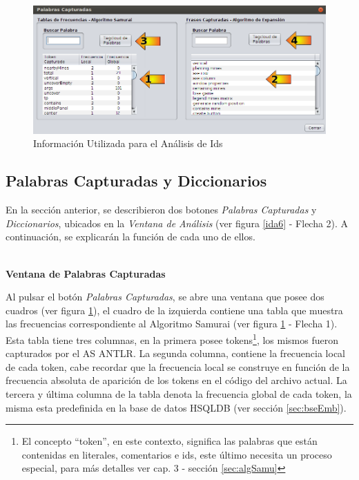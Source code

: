 \begin{figure}[t] %
\centerline{%
\includegraphics[scale= 0.55]{./cap4/ida_07.png}
}
\caption{Información Utilizada para el Análisis de Ids}
\label{ida7}
\end{figure}

\subsection{Palabras Capturadas y Diccionarios}
\label{sec:panPalDicc}

En la sección anterior, se describieron dos botones \textit{Palabras Capturadas} y \textit{Diccionarios}, ubicados en la \textit{Ventana de Análisis} (ver figura \ref{ida6} - Flecha 2). A continuación, se explicarán la función de cada uno de ellos.

\noindent \textbf{\\Ventana de Palabras Capturadas\\} 

Al pulsar el botón \textit{Palabras Capturadas}, se abre una ventana que posee dos cuadros (ver figura \ref{ida7}), el cuadro de la izquierda contiene una tabla que muestra las frecuencias correspondiente al Algoritmo Samurai (ver figura \ref{ida7} - Flecha 1). Esta tabla tiene tres columnas, en la primera posee tokens\footnote[1]{El concepto “token”, en este contexto, significa las palabras que están contenidas en literales, comentarios e ids, este último necesita un proceso especial, para más detalles ver cap. 3 - sección \ref{sec:algSamu}}, los mismos fueron capturados por el AS ANTLR. La segunda columna, contiene la frecuencia local de cada token, cabe recordar que la frecuencia local se construye en función de la frecuencia absoluta de aparición de los tokens en el código del archivo actual. La tercera y última columna de la tabla denota la frecuencia global de cada token, la misma esta predefinida en la base de datos HSQLDB (ver sección \ref{sec:bseEmb}).

